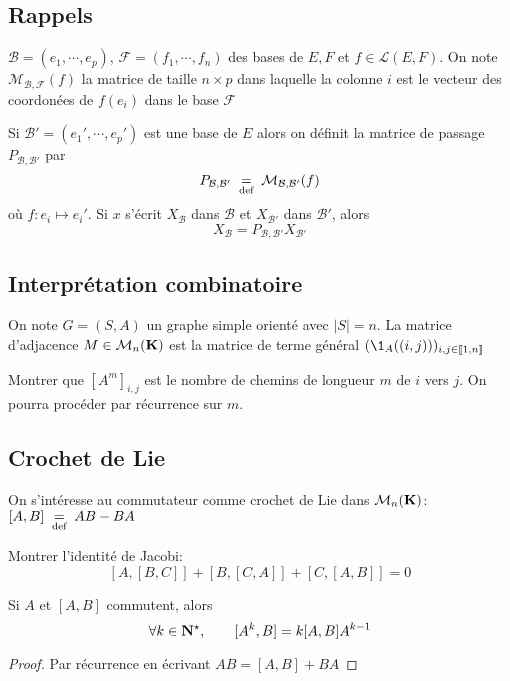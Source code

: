 \subsection{Rappels}

$\mathcal  B=(e_1, \cdots , e_p)$, $\mathcal  F=(f_1, \cdots , f_n)$ des bases de $E, F$ et  $f \in  \mathcal  L(E, F)$. On note $\mathcal  M_{\mathcal  B, \mathcal  F}(f)$ la matrice de taille $n\times p$ dans laquelle la colonne  $i$ est le vecteur des coordonées de  $f(e_i)$ dans le base  $\mathcal  F$

Si $\mathcal  B'=(e_1', \cdots , e_p')$ est une base de $E$ alors on définit la matrice de passage  $P_{\mathcal  B, \mathcal  B'}$ par  \[
    P_{\mathcal  B, \mathcal  B'}\;\underset{\text{def}}=\; \mathcal  M_{\mathcal  B, \mathcal  B'}(f)
\] 
où $f:e_i\longmapsto e_i'$. Si $x$ s'écrit  $X_{\mathcal  B}$ dans $\mathcal  B$ et $X_{\mathcal  B'}$ dans $\mathcal B'$, alors \[
X_{\mathcal  B}=P_{\mathcal  B, \mathcal B'}X_{\mathcal  B'}
\] 

\subsection{Interprétation combinatoire}

On note $G=(S, A)$ un graphe simple orienté avec  $|S|=n$. La matrice d'adjacence  $M \in  \mathcal  M_n(\mathbf K)$ est la matrice de terme général $(\1_A((i, j)))_{i, j \in  \llbracket 1, n \rrbracket }$ 

\begin{exo}
    Montrer que $[A^m]_{i,j}$ est le nombre de chemins de longueur $m$ de  $i$ vers  $j$. On pourra procéder par récurrence sur  $m$.
\end{exo}

\subsection{Crochet de Lie}

On s'intéresse au commutateur comme crochet de Lie dans $\mathcal  M_n(\mathbf K)$: $[A, B]\;\underset{\text{def}}=\; AB-BA$

 \begin{exo}
Montrer l'identité de Jacobi: \[
    [A, [B, C]]+[B, [C, A]]+[C, [A, B]]=0
\]
\end{exo}

\begin{exo}
    Si $A$  et  $[A, B]$ commutent, alors  \[
        \forall  k \in  \mathbf N^\star, \qquad [A^k,B]=k[A, B]A^{k-1}
    \] 
\end{exo}
\begin{proof}
    Par récurrence en écrivant $AB=[A, B]+BA$
\end{proof}

